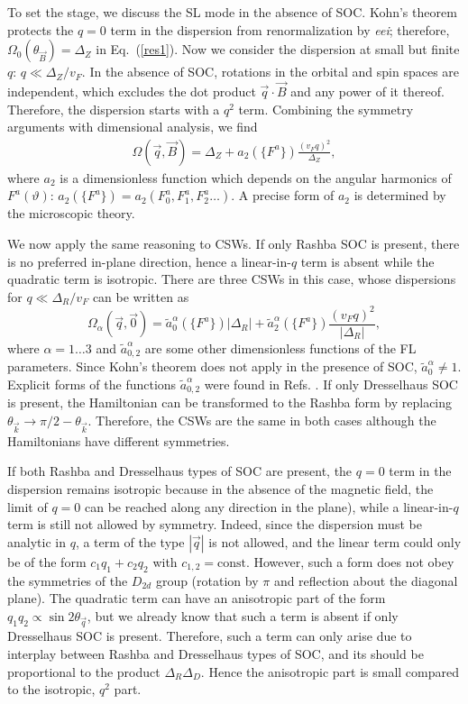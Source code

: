 \documentclass[prb,aps,twocolumn]{revtex4}
\newcommand{\beq}{\begin{equation}}
\newcommand{\eeq}{\end{equation}}
\newcommand{\bea}{\begin{eqnarray}}
\newcommand{\eea}{\end{eqnarray}}
\newcommand{\bk}{{\vec k}}
\newcommand{\bq}{{\vec q}}
\newcommand{\bB}{{\vec B}}
\begin{document}
To set the stage, we discuss  the SL mode in the absence of SOC.
Kohn's theorem protects the $q=0$ term in the dispersion from
renormalization by {\em eei};\cite{kohn,yafet} therefore,
$\Omega_0(\theta_{\bB} )=\Delta_Z$  in Eq.~(\ref{res1}).  Now we
consider the dispersion at small but finite $q$: $q\ll
\Delta_Z/v_F$. In the absence of SOC, rotations in the orbital and
spin spaces are independent, which excludes the dot product
$\bq\cdot \bB$ and any power of it thereof. Therefore, the
dispersion starts with a $q^2$ term. Combining the symmetry
arguments with dimensional analysis, we find \bea
\Omega(\bq,\bB)=\Delta_Z+a_2(\{F^a\})\frac{(v_Fq)^2}{\Delta_Z},\label{eq:mt3}
\eea where $a_2$ is a dimensionless function which depends on the
angular harmonics of $F^a(\vartheta)$:
$a_2(\{F^a\})=a_2(F^a_0,F^a_1,F^a_2\dots)$. A precise form of
$a_2$ is determined by the microscopic theory.
\cite{silin:1958,mineev}

We now apply the same reasoning to CSWs. If only Rashba SOC is
present, there is no preferred in-plane direction, hence a
linear-in-$q$ term is absent while the quadratic term is
isotropic.  There are three CSWs in this case, whose dispersions
for $q\ll\Delta_R/v_F$ can be written as \beq
\Omega_\alpha(\bq,\vec 0)=\tilde a_{0}^\alpha(\{F^a\})
{|\Delta_R|}+\tilde a_{2}^\alpha(\{F^a\})\frac{(v_Fq)^2}{
{|\Delta_R|}},\eeq  where $\alpha=1\dots3$ and $\tilde
a^\alpha_{0,2}$ are some other dimensionless functions of the FL
parameters. Since Kohn's theorem does not apply in the presence of
SOC, $\tilde a_{0}^\alpha \neq 1$. Explicit forms of the functions
$\tilde a^\alpha_{0,2}$ were found in Refs.
. If only Dresselhaus SOC is present,
the Hamiltonian can be transformed to the Rashba form by replacing
$\theta_\bk\rightarrow \pi/2-\theta_\bk$. Therefore, the CSWs are
the same in both cases although the Hamiltonians have different
symmetries.

If both Rashba and Dresselhaus types of SOC are present, the $q=0$
term in the dispersion remains isotropic because in the
absence of the magnetic field, the limit of $q=0$ can be reached along any direction in the plane), while a
linear-in-$q$ term is still not allowed by symmetry.
Indeed, since the dispersion must be analytic in $q$, a term of
the type $|\bq|$ is not allowed, and the linear term could only be
of the form $c_1q_1+c_2q_2$ with $c_{1,2}=\text{const}$. However,
such a form does not obey the symmetries of the $D_{2d}$ group
(rotation by $\pi$ and reflection about the diagonal plane). The
quadratic term can have an anisotropic part of the form
$q_1q_2\propto\sin2\theta_{\bq}$, but we already know that such a
term is absent if only Dresselhaus SOC is present. Therefore, such
a term can only arise due to interplay between Rashba and
Dresselhaus types of SOC, and its should be proportional to the
product $\Delta_R\Delta_D$. Hence the anisotropic part is small
compared to the isotropic, $q^2$ part.
\end{document}

